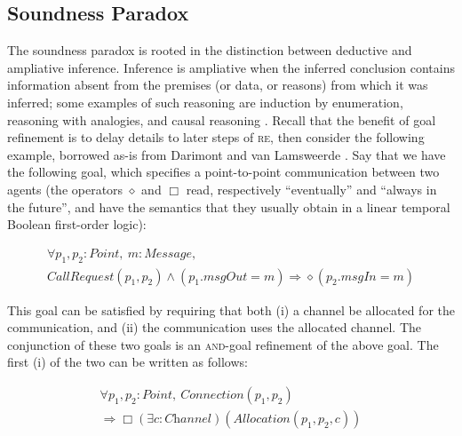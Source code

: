 \documentclass[10pt, conference, compsocconf]{IEEEtran}
\begin{document}
\subsection{Soundness Paradox}\label{sect:paradoxes:soundness}
The soundness paradox is rooted in the distinction between deductive and ampliative inference. Inference is ampliative when the inferred conclusion contains information absent from the premises (or data, or reasons) from which it was inferred; some examples of such reasoning are induction by enumeration, reasoning with analogies, and causal reasoning \cite{Swoyer:2008}. Recall that the benefit of goal refinement is to delay details to later steps of \textsc{re}, then consider the following example, borrowed as-is from Darimont and van Lamsweerde \cite{Darimont+:1996:FSE}. Say that we have the following goal, which specifies a point-to-point communication between two agents (the operators $\diamond$ and $\Box$ read, respectively ``eventually'' and ``always in the future'', and have the semantics that they usually obtain in a linear temporal Boolean first-order logic): 

\begin{small}
\begin{multline*}
\forall p_{1}, p_{2}: \textit{Point},\ m:\textit{Message}, \\
\textit{CallRequest}(p_{1}, p_{2}) \wedge (p_{1}.\textit{msgOut} = m) \Rightarrow \diamond(p_{2}.\textit{msgIn} = m)
\end{multline*}
\end{small}

This goal can be satisfied by requiring that both (i) a channel be allocated for the communication, and (ii) the communication uses the allocated channel. The conjunction of these two goals is an \textsc{and}-goal refinement of the above goal. The first (i) of the two can be written as follows:

\begin{small}
\begin{multline*}
\forall p_{1}, p_{2}: \textit{Point},\ \textit{Connection}(p_{1}, p_{2}) \\
\Rightarrow \Box(\exists c:\textit{Channel})(\textit{Allocation}(p_{1}, p_{2}, c))
\end{multline*}
\end{small}
\end{document}
